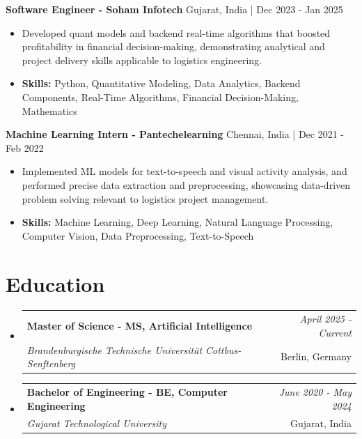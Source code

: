 \documentclass[a4paper,11pt]{article}
\makeatletter
\newcommand{\resumeSubheading}[4]{
\vspace{0.5mm}\item
    \begin{tabular*}{0.98\textwidth}[t]{l@{\extracolsep{\fill}}r}
        \textbf{#1} & \textit{\footnotesize{#4}} \\
        \textit{\footnotesize{#3}} &  \footnotesize{#2}\\
    \end{tabular*}
    \vspace{-2.4mm}
}
\makeatother
\begin{document}
\vspace{1mm}
  \textbf{Software Engineer - Soham Infotech} \hfill Gujarat, India | Dec 2023 - Jan 2025
\vspace{-1.5mm} %
\begin{itemize}
  \item Developed quant models and backend real-time algorithms that boosted profitability in financial decision-making, demonstrating analytical and project delivery skills applicable to logistics engineering.

\vspace{-2mm}
  \item \textbf{Skills:} Python, Quantitative Modeling, Data Analytics, Backend Components, Real-Time Algorithms, Financial Decision-Making, Mathematics
\end{itemize}

\vspace{1mm}
  \textbf{Machine Learning Intern - Pantechelearning} \hfill Chennai, India | Dec 2021 - Feb 2022
\vspace{-1.5mm} %
\begin{itemize}
  \item Implemented ML models for text-to-speech and visual activity analysis, and performed precise data extraction and preprocessing, showcasing data-driven problem solving relevant to logistics project management.
\vspace{-2mm}
  \item \textbf{Skills:} Machine Learning, Deep Learning, Natural Language Processing, Computer Vision, Data Preprocessing, Text-to-Speech
\end{itemize}\section{\textbf{Education}}
\vspace{-0.4mm}

\begin{itemize}
\resumeSubheading
{Master of Science - MS, Artificial Intelligence }{Berlin, Germany}
{Brandenburgische Technische Universität Cottbus-Senftenberg  }{April 2025 - Current}

\vspace{1.0mm} %
\resumeSubheading
{Bachelor of Engineering - BE, Computer Engineering  }{Gujarat, India}
{Gujarat Technological University }{June 2020 - May 2024}

\end{itemize}
\end{document}

